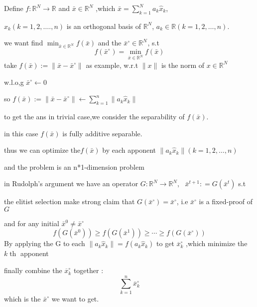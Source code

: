 \documentclass{article}
\newcommand{\assign}{:=}
\newcommand{\tmop}[1]{\ensuremath{\operatorname{#1}}}
\begin{document}
Define $f : \mathbb{R}^N \rightarrow \mathbb{R}$ and $ \bar{x} \in
\mathbb{R}^N$ ,which $\bar{x} = \sum^N_{k = 1} a_k  \hat{x}_k$, \

$\widehat{x }_k (k = 1, 2, \ldots ., n)$ is an orthogonal basis of
$\mathbb{R}^N$, $a_k \in \mathbb{R}  (k = 1, 2, \ldots, n)$.

we want find $\min_{\bar{x} \in \mathbb{R}^N} f (\bar{x})$ and the
$\bar{x}^{\circ} \in {\mathbb{R}^N}^{}$, s.t
\[ f \left( {\bar{x}^{\circ}}^{} \right) = \min_{\bar{x} \in \mathbb{R}^N} f
   (\bar{x}) \]
take $f (\bar{x}) \assign \| \bar{x} - \bar{x}^{\circ} \|$ as example, w.r.t
$\| x \|$ is the norm of $x \in \mathbb{R}^N$

w.l.o,g $\bar{x}^{\circ} \leftarrow 0$

so $f (\bar{x}) \assign \| \bar{x} - \bar{x}^{\circ} \| \leftarrow \sum_{k =
1}^n \| a_k  \hat{x}_k \|$

to get the ans in trivial case,we consider the separability of $f (\bar{x})$.

in this case $f (\bar{x})$ is fully additive separable.

thus we can optimize the$f (\bar{x})$ by each apponent $\| a_k  \hat{x}_k \| 
(k = 1, 2, \ldots, n)$

and the problem is an n*1-dimension problem

in Rudolph's argument we have an operator $G : \mathbb{R}^N \rightarrow
\mathbb{R}^N$, \ $\bar{x}^{t + 1} : = G (\bar{x}^t)$ s.t

the elitist selection make strong claim that $G (\bar{x}^{\circ}) =
\bar{x}^{\circ}$, i.e $\bar{x}^{\circ}$ is a fixed-proof of $G$

and for any initial $\bar{x}^0 \neq \bar{x}^{\circ}$
\[ f (G (\bar{x}^0)) \geqslant f (G (\bar{x}^1)) \geqslant \cdots \geqslant f
   (G (\bar{x}^{\circ})) \]
By applying the G to each $\| a_k  \hat{x}_k \| = f (a_k  \hat{x}_k)$ to get
$\overline{x }^{\circ}_k$ ,which minimize the $k \tmop{th}$ apponent

finally combine the $\overline{x }^{\circ}_k$ together :
\[ \sum_{k = 1}^n \overline{x }^{\circ}_k \]
which is the $\bar{x}^{\circ}$ we want to get.
\end{document}
